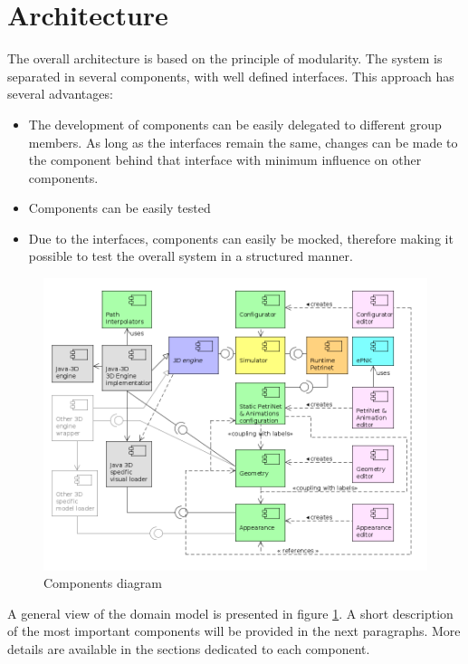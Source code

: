 \section{Architecture}
\label{sec:architecture}

The overall architecture is based on the principle of modularity.
The system is separated in several components, with well defined
interfaces. This approach has several advantages:
\begin{itemize}
  \item The development of components can be easily delegated to different group
    members. As long as the interfaces remain the same, changes can be made to the
	component behind that interface with minimum influence on other components.
  \item Components can be easily tested
  \item Due to the interfaces, components can easily be mocked, therefore making it 
  	possible to test the overall system in a structured manner. 
\end{itemize}

\begin{figure}[ht]
   \begin{center}
       \includegraphics[scale=0.35]{image/components.png}
       \caption{Components diagram}
       \label{fig:components}	
       \end{center}
   \end{figure}

A general view of the domain model is presented in figure \ref{fig:components}. A short description of 
the most important components will be provided in the next paragraphs. More details are available
in the sections dedicated to each component. 

